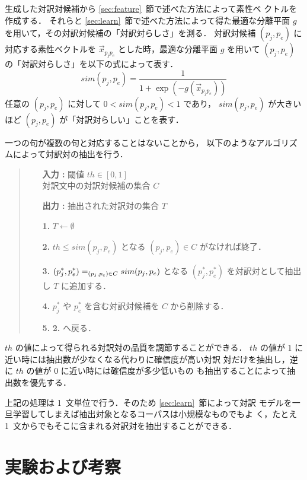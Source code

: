生成した対訳対候補から \ref{sec:feature}~節で述べた方法によって素性ベ
クトルを作成する．
それらと \ref{sec:learn}~節で述べた方法によって得た最適な分離平面 $g$
を用いて，その対訳対候補の「対訳対らしさ」を測る．
対訳対候補 $(p_j, p_e)$
に対応する素性ベクトルを $\vec{x}_{p_j p_e}$ とした時，最適な分離平面
$g$ を用いて $(p_j, p_e)$ の「対訳対らしさ」を以下の式によって表す．
\begin{equation}
  \label{eq:sim}
  sim(p_j, p_e) = \frac{1}{1+\exp(-g(\vec{x}_{p_j p_e}))}
\end{equation}
任意の $(p_j, p_e)$ に対して $0 < sim(p_j, p_e) < 1$ であり，
$sim(p_j, p_e)$ が大きいほど $(p_j, p_e)$ が「対訳対らしい」ことを表す．

一つの句が複数の句と対応することはないことから，
以下のようなアルゴリズムによって対訳対の抽出を行う．
\begin{quote}
  \begin{enumerate}
  \item[{\bf 入力 :}]
    閾値 $th \in [0,1]$\\
    対訳文中の対訳対候補の集合 $C$
  \item[{\bf 出力 :}]
    抽出された対訳対の集合 $T$
  \item[{\bf 1.}]
    $T \leftarrow \emptyset$
  \item[{\bf 2.}]
    $th \leq sim(p_j, p_e)$ となる $(p_j, p_e) \in C$ がなければ終了．
  \item[{\bf 3.}]
    $\displaystyle (p_j^*, p_e^*)=_{(p_j, p_e) \in C} sim(p_j,
    p_e)$ となる $(p_j^*, p_e^*)$ を対訳対として抽出し $T$ に追加する．
  \item[{\bf 4.}]
    $p_j^*$ や $p_e^*$ を含む対訳対候補を $C$ から削除する．
  \item[{\bf 5.}]
    {\bf 2.} へ戻る．
  \end{enumerate}
\end{quote}

$th$ の値によって得られる対訳対の品質を調節することができる．
$th$ の値が $1$ に近い時には抽出数が少なくなる代わりに確信度が高い対訳
対だけを抽出し，逆に $th$ の値が $0$ に近い時には確信度が多少低いもの
も抽出することによって抽出数を優先する．

上記の処理は 1~文単位で行う．そのため \ref{sec:learn}~節によって対訳
モデルを一旦学習してしまえば抽出対象となるコーパスは小規模なものでもよ
く，たとえ 1~文からでもそこに含まれる対訳対を抽出することができる．

\section{実験および考察}
\label{sec:experiment_discussion}



